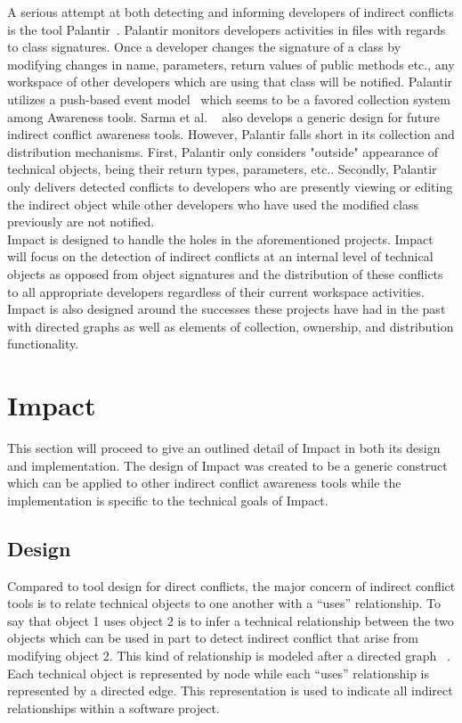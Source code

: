 \documentclass[conference]{IEEEtran}
\begin{document}
A serious attempt at both detecting and informing developers of
indirect conflicts is the tool Palantir~\cite{Sarma:2007:TSA}. Palantir
monitors developers activities in files with regards to class signatures.
Once a developer changes the signature of a class by modifying changes
in name, parameters, return values of public methods etc., any workspace
of other developers which are using that class will be notified. Palantir utilizes
a push-based event model~\cite{Fitzpatrick:2002:SPA} which seems to be
a favored collection system among Awareness tools. Sarma et al.
~\cite{Sarma:2007:TSA} also
develops a generic design for future indirect conflict awareness tools. 
However, Palantir falls short in its collection and distribution
mechanisms. First, Palantir only considers "outside" appearance of technical
objects, being their return types, parameters, etc.. Secondly, Palantir 
only delivers
detected conflicts to developers who are presently viewing or editing
the indirect object while other developers who have used the modified 
class previously are not notified.\\

Impact is designed to handle the holes in the aforementioned projects.
Impact will focus on the detection of indirect conflicts at an internal level
of technical objects as opposed from object signatures and the distribution
of these conflicts to all appropriate developers regardless of their current
workspace activities. Impact is also designed around the successes these
projects have had in the past with directed graphs as 
well as elements of collection, ownership, and distribution functionality.\\


\section{Impact}
This section will proceed to give an outlined detail of Impact in both its
design and implementation. The design of Impact was created to be
a generic construct which can be applied to other indirect conflict 
awareness tools while the implementation is specific to the technical
goals of Impact.

\subsection{Design}
Compared to tool design for direct conflicts, the major concern of 
indirect conflict tools is to relate technical objects to one another
with a ``uses'' relationship. To say that object 1 uses object 2 is to infer
a technical relationship between the two objects which can be used
in part to detect indirect conflict that arise from modifying object
2. This kind of relationship is modeled after a directed graph ~\cite{Horwitz:1992:UPD}. 
Each technical object is represented by node while each ``uses''
relationship is represented by a directed edge. This representation
is used to indicate all indirect relationships within a software project.\\
\end{document}
